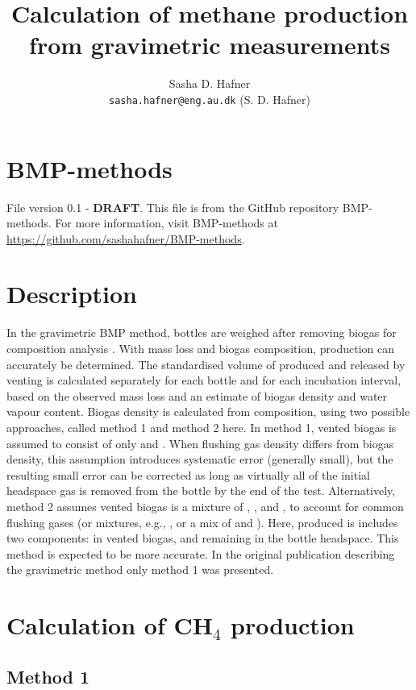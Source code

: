 \documentclass[]{article}
\title {Calculation of methane production from gravimetric measurements}
\author{Sasha D. Hafner
\\
\texttt{sasha.hafner@eng.au.dk} (S. D. Hafner)\\
}
\begin{document}
\maketitle

\section{BMP-methods}
File version 0.1 - \textbf{DRAFT}. 
This file is from the GitHub repository BMP-methods.
For more information, visit BMP-methods at \url{https://github.com/sashahafner/BMP-methods}.

\section{Description}
In the gravimetric BMP method, bottles are weighed after removing biogas for composition analysis \cite{validation}.
With mass loss and biogas composition,  production can accurately be determined.
The standardised volume of  produced and released by venting is calculated separately for each bottle and for each incubation interval, based on the observed mass loss and an estimate of biogas density and water vapour content. 
Biogas density is calculated from composition, using two possible approaches, called method 1 and method 2 here.
In method 1, vented biogas is assumed to consist of only  and . 
When flushing gas density differs from biogas density, this assumption introduces systematic error (generally small), but the resulting small error can be corrected as long as virtually all of the initial headspace gas is removed from the bottle by the end of the test. 
Alternatively, method 2 assumes vented biogas is a mixture of , , and , to account for common flushing gases (or mixtures, e.g., , or a mix of  and ).
Here, produced  is includes two components:  in vented biogas, and  remaining in the bottle headspace.
This method is expected to be more accurate.
In the original publication describing the gravimetric method \cite{validation} only method 1 was presented.

\section{Calculation of CH$_4$ production}

\subsection{Method 1}
\end{document}
